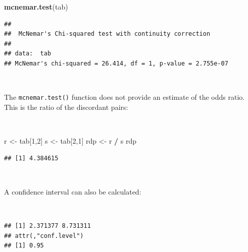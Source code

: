 \documentclass[12pt,a4paper]{book}
\newenvironment{Shaded}{\begin{snugshade}}{\end{snugshade}}
\newcommand{\DecValTok}[1]{\textcolor[rgb]{0.00,0.00,0.81}{#1}}
\newcommand{\KeywordTok}[1]{\textcolor[rgb]{0.13,0.29,0.53}{\textbf{#1}}}
\newcommand{\NormalTok}[1]{#1}
\newcommand{\OperatorTok}[1]{\textcolor[rgb]{0.81,0.36,0.00}{\textbf{#1}}}
\newcommand{\StringTok}[1]{\textcolor[rgb]{0.31,0.60,0.02}{#1}}
\theoremstyle{definition}
\theoremstyle{definition}
\theoremstyle{definition}
\theoremstyle{remark}
\begin{document}
\begin{Shaded}
\begin{Highlighting}[]
\KeywordTok{mcnemar.test}\NormalTok{(tab)}
\end{Highlighting}
\end{Shaded}

\begin{verbatim}
## 
##  McNemar's Chi-squared test with continuity correction
## 
## data:  tab
## McNemar's chi-squared = 26.414, df = 1, p-value = 2.755e-07
\end{verbatim}

~

The \texttt{mcnemar.test()} function does not provide an estimate of the
odds ratio. This is the ratio of the discordant pairs:

~

\begin{Shaded}
\begin{Highlighting}[]
\NormalTok{r <-}\StringTok{ }\NormalTok{tab[}\DecValTok{1}\NormalTok{,}\DecValTok{2}\NormalTok{]}
\NormalTok{s <-}\StringTok{ }\NormalTok{tab[}\DecValTok{2}\NormalTok{,}\DecValTok{1}\NormalTok{]}
\NormalTok{rdp <-}\StringTok{ }\NormalTok{r }\OperatorTok{/}\StringTok{ }\NormalTok{s}
\NormalTok{rdp}
\end{Highlighting}
\end{Shaded}

\begin{verbatim}
## [1] 4.384615
\end{verbatim}

~

A confidence interval can also be calculated:

~

\begin{Shaded}
\end{Shaded}

\begin{verbatim}
## [1] 2.371377 8.731311
## attr(,"conf.level")
## [1] 0.95
\end{verbatim}

~
\end{document}
